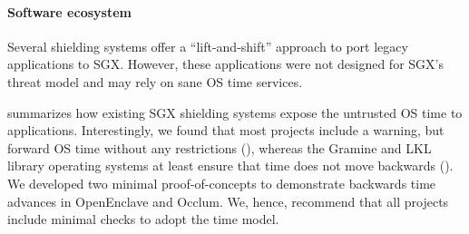 \documentclass[sigplan,10pt]{acmart}
\begin{document}
\paragraph{Software ecosystem}
Several shielding systems offer a ``lift-and-shift'' approach to port legacy
applications to SGX. However, these applications were not designed for SGX's
threat model and may rely on sane OS time services.

 summarizes how existing SGX shielding systems expose the
untrusted OS time to applications. Interestingly, we found that most projects
include a warning, but forward OS time without any restrictions (\Tzero{}),
whereas the Gramine and LKL library operating systems at least ensure that time
does not move backwards (\Tone{}). We developed two minimal proof-of-concepts to
demonstrate backwards time advances in OpenEnclave and Occlum. We, hence,
recommend that all projects include minimal checks to adopt the \Tone{} time
model.






\end{document}
